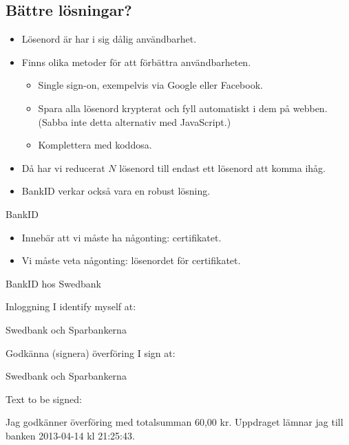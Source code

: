 \documentclass{beamer}
\begin{document}
\subsection{Bättre lösningar?}

\begin{frame}
  \begin{itemize}
    \item Lösenord är har i sig dålig användbarhet.

    \item Finns olika metoder för att förbättra användbarheten.
      \begin{itemize}
        \item Single sign-on, exempelvis via Google eller Facebook.
        \item Spara alla lösenord krypterat och fyll automatiskt i dem på 
          webben.
          (Sabba inte detta alternativ med JavaScript.)
        \item Komplettera med koddosa.
      \end{itemize}

    \item Då har vi reducerat \(N\) lösenord till endast ett lösenord att komma 
      ihåg.

      \pause{}

    \item BankID verkar också vara en robust lösning.

  \end{itemize}
\end{frame}

\begin{frame}{BankID}
  \begin{itemize}
    \item Innebär att vi måste ha någonting: certifikatet.
    \item Vi måste veta någonting: lösenordet för certifikatet.
  \end{itemize}
\end{frame}

\begin{frame}{BankID hos Swedbank}
  \begin{block}{Inloggning}
    I identify myself at:
    
    Swedbank och Sparbankerna
  \end{block}
  \begin{block}{Godkänna (signera) överföring}
    I sign at:
    
    Swedbank och Sparbankerna

    \vspace{1em}
    Text to be signed:

    Jag godkänner överföring med totalsumman 60,00 kr.
    Uppdraget lämnar jag till banken 2013-04-14 kl 21:25:43.
  \end{block}
\end{frame}
\end{document}
